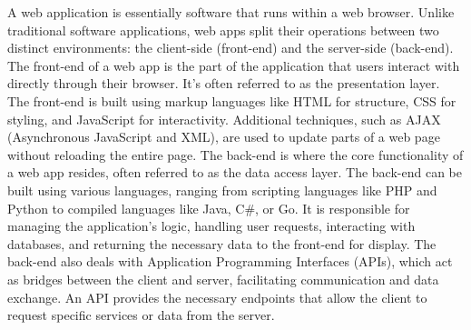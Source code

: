 A web application is essentially software that runs within a web browser. Unlike traditional software applications, web apps split their operations between two distinct environments: the client-side (front-end) and the server-side (back-end). The front-end of a web app is the part of the application that users interact with directly through their browser. It’s often referred to as the presentation layer. The front-end is built using markup languages like HTML for structure, CSS for styling, and JavaScript for interactivity. Additional techniques, such as AJAX (Asynchronous JavaScript and XML), are used to update parts of a web page without reloading the entire page. The back-end is where the core functionality of a web app resides, often referred to as the data access layer. The back-end can be built using various languages, ranging from scripting languages like PHP and Python to compiled languages like Java, C\#, or Go. It is responsible for managing the application’s logic, handling user requests, interacting with databases, and returning the necessary data to the front-end for display. The back-end also deals with Application Programming Interfaces (APIs), which act as bridges between the client and server, facilitating communication and data exchange. An API provides the necessary endpoints that allow the client to request specific services or data from the server.



